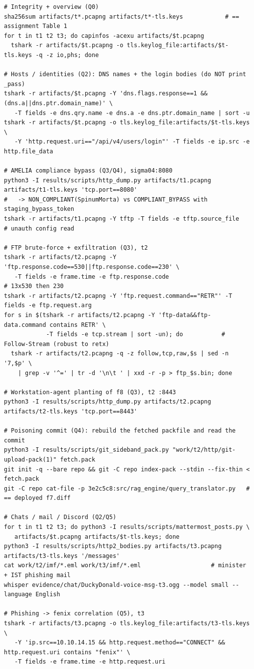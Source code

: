 \documentclass[11pt,a4paper,final,oneside]{article}
\begin{document}
{\scriptsize
\begin{verbatim}
# Integrity + overview (Q0)
sha256sum artifacts/t*.pcapng artifacts/t*-tls.keys            # == assignment Table 1
for t in t1 t2 t3; do capinfos -acexu artifacts/$t.pcapng
  tshark -r artifacts/$t.pcapng -o tls.keylog_file:artifacts/$t-tls.keys -q -z io,phs; done

# Hosts / identities (Q2): DNS names + the login bodies (do NOT print _pass)
tshark -r artifacts/$t.pcapng -Y 'dns.flags.response==1 && (dns.a||dns.ptr.domain_name)' \
   -T fields -e dns.qry.name -e dns.a -e dns.ptr.domain_name | sort -u
tshark -r artifacts/$t.pcapng -o tls.keylog_file:artifacts/$t-tls.keys \
   -Y 'http.request.uri=="/api/v4/users/login"' -T fields -e ip.src -e http.file_data

# AMELIA compliance bypass (Q3/Q4), sigma04:8080
python3 -I results/scripts/http_dump.py artifacts/t1.pcapng artifacts/t1-tls.keys 'tcp.port==8080'
#   -> NON_COMPLIANT(SpinumMorta) vs COMPLIANT_BYPASS with staging_bypass_token
tshark -r artifacts/t1.pcapng -Y tftp -T fields -e tftp.source_file        # unauth config read

# FTP brute-force + exfiltration (Q3), t2
tshark -r artifacts/t2.pcapng -Y 'ftp.response.code==530||ftp.response.code==230' \
   -T fields -e frame.time -e ftp.response.code                            # 13x530 then 230
tshark -r artifacts/t2.pcapng -Y 'ftp.request.command=="RETR"' -T fields -e ftp.request.arg
for s in $(tshark -r artifacts/t2.pcapng -Y 'ftp-data&&ftp-data.command contains RETR' \
            -T fields -e tcp.stream | sort -un); do           # Follow-Stream (robust to retx)
  tshark -r artifacts/t2.pcapng -q -z follow,tcp,raw,$s | sed -n '7,$p' \
    | grep -v '^=' | tr -d '\n\t ' | xxd -r -p > ftp_$s.bin; done

# Workstation-agent planting of f8 (Q3), t2 :8443
python3 -I results/scripts/http_dump.py artifacts/t2.pcapng artifacts/t2-tls.keys 'tcp.port==8443'

# Poisoning commit (Q4): rebuild the fetched packfile and read the commit
python3 -I results/scripts/git_sideband_pack.py "work/t2/http/git-upload-pack(1)" fetch.pack
git init -q --bare repo && git -C repo index-pack --stdin --fix-thin < fetch.pack
git -C repo cat-file -p 3e2c5c8:src/rag_engine/query_translator.py   # == deployed f7.diff

# Chats / mail / Discord (Q2/Q5)
for t in t1 t2 t3; do python3 -I results/scripts/mattermost_posts.py \
   artifacts/$t.pcapng artifacts/$t-tls.keys; done
python3 -I results/scripts/http2_bodies.py artifacts/t3.pcapng artifacts/t3-tls.keys '/messages'
cat work/t2/imf/*.eml work/t3/imf/*.eml                    # minister + IST phishing mail
whisper evidence/chat/DuckyDonald-voice-msg-t3.ogg --model small --language English

# Phishing -> fenix correlation (Q5), t3
tshark -r artifacts/t3.pcapng -o tls.keylog_file:artifacts/t3-tls.keys \
   -Y 'ip.src==10.10.14.15 && http.request.method=="CONNECT" && http.request.uri contains "fenix"' \
   -T fields -e frame.time -e http.request.uri
\end{verbatim}}
\end{document}
